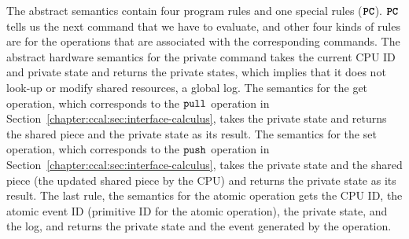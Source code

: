 The abstract semantics contain 
four program rules and one special rules (${{\mathrm{\texttt{\textbf{PC}}}}}$). 
${{\mathrm{\texttt{\textbf{PC}}}}}$ tells us the next command that we have to evaluate, 
and other four kinds of rules are for the operations that are associated with the corresponding commands.
The abstract hardware semantics for the private command takes the current CPU ID and private state and returns the private states, which implies that 
it does not look-up or modify shared resources, a global log.
The semantics for the get operation, which corresponds to the ${\mathrm{\texttt{pull}}}$ operation in Section~\ref{chapter:ccal:sec:interface-calculus}, takes the private state and returns the shared piece and the private state as its result. 
The semantics for the set operation,  which corresponds to the ${\mathrm{\texttt{push}}}$ operation in Section~\ref{chapter:ccal:sec:interface-calculus}, takes the private state and the shared piece (the updated shared piece by the CPU) and returns the private state as its result. 
The last rule, the semantics for the atomic operation gets the CPU ID, the atomic event ID (primitive ID for the atomic operation), 
the private state, and the log, and returns the private state and the event generated by the operation. 



